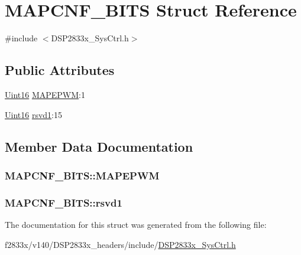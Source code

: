 \hypertarget{struct_m_a_p_c_n_f___b_i_t_s}{}\section{M\+A\+P\+C\+N\+F\+\_\+\+B\+I\+T\+S Struct Reference}
\label{struct_m_a_p_c_n_f___b_i_t_s}


{\ttfamily \#include $<$D\+S\+P2833x\+\_\+\+Sys\+Ctrl.\+h$>$}

\subsection*{Public Attributes}
\begin{DoxyCompactItemize}
\item 
\hyperlink{_d_s_p2833x___device_8h_a59a9f6be4562c327cbfb4f7e8e18f08b}{Uint16} \hyperlink{struct_m_a_p_c_n_f___b_i_t_s_ae24a01c20d8c8da0b6efe6990e817f8e}{M\+A\+P\+E\+P\+W\+M}\+:1
\item 
\hyperlink{_d_s_p2833x___device_8h_a59a9f6be4562c327cbfb4f7e8e18f08b}{Uint16} \hyperlink{struct_m_a_p_c_n_f___b_i_t_s_a876a265c687f8c2c880719a7e3934c5d}{rsvd1}\+:15
\end{DoxyCompactItemize}


\subsection{Member Data Documentation}
\hypertarget{struct_m_a_p_c_n_f___b_i_t_s_ae24a01c20d8c8da0b6efe6990e817f8e}{}
\subsubsection[{M\+A\+P\+E\+P\+W\+M}]{ M\+A\+P\+C\+N\+F\+\_\+\+B\+I\+T\+S\+::\+M\+A\+P\+E\+P\+W\+M}\label{struct_m_a_p_c_n_f___b_i_t_s_ae24a01c20d8c8da0b6efe6990e817f8e}
\hypertarget{struct_m_a_p_c_n_f___b_i_t_s_a876a265c687f8c2c880719a7e3934c5d}{}
\subsubsection[{rsvd1}]{ M\+A\+P\+C\+N\+F\+\_\+\+B\+I\+T\+S\+::rsvd1}\label{struct_m_a_p_c_n_f___b_i_t_s_a876a265c687f8c2c880719a7e3934c5d}


The documentation for this struct was generated from the following file\+:\begin{DoxyCompactItemize}
\item 
f2833x/v140/\+D\+S\+P2833x\+\_\+headers/include/\hyperlink{_d_s_p2833x___sys_ctrl_8h}{D\+S\+P2833x\+\_\+\+Sys\+Ctrl.\+h}\end{DoxyCompactItemize}
